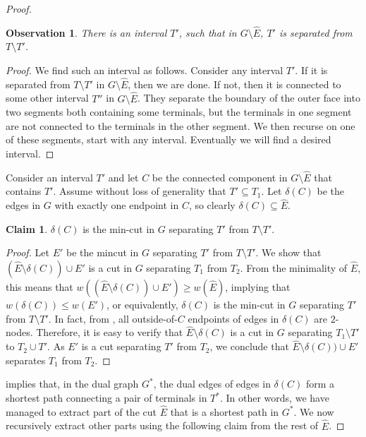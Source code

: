 \documentclass[11pt]{article}
\newtheorem{observation}[theorem]{Observation}
\theoremstyle{definition}
\newtheorem{claim}[theorem]{Claim}
\begin{document}
\begin{proof}
	\begin{observation}
		\label{obs: interval}
		There is an interval $T'$, such that in $G\setminus \hat E$, $T'$ is separated from $T\setminus T'$.
	\end{observation}
	\begin{proof}
		We find such an interval as follows. Consider any interval $T'$. If it is separated from $T\setminus T'$ in $G\setminus \hat E$, then we are done. If not, then it is connected to some other interval $T''$ in $G\setminus \hat E$. They separate the boundary of the outer face into two segments both containing some terminals, but the terminals in one segment are not connected to the terminals in the other segment. We then recurse on one of these segments, start with any interval. Eventually we will find a desired interval.
	\end{proof}
	
	Consider an interval $T'$ and let $C$ be the connected component in $G\setminus \hat E$ that contains $T'$. Assume without loss of generality that $T'\subseteq T_1$. Let $\delta(C)$ be the edges in $G$ with exactly one endpoint in $C$, so clearly $\delta(C)\subseteq \hat E$. 
	
	\begin{claim}
		\label{clm: interval cut}
		$\delta(C)$ is the min-cut in $G$ separating $T'$ from $T\setminus T'$.
	\end{claim}
	\begin{proof}
		Let $E'$ be the mincut in $G$ separating $T'$ from $T\setminus T'$. We show that $(\hat E\setminus \delta(C))\cup E'$ is a cut in $G$ separating $T_1$ from $T_2$. From the minimality of $\hat E$, this means that $w((\hat E\setminus \delta(C))\cup E')\ge w(\hat E)$, implying that $w(\delta(C))\le w(E')$, or equivalently, $\delta(C)$ is the min-cut in $G$ separating $T'$ from $T\setminus T'$.
In fact, from , all outside-of-$C$ endpoints of edges in $\delta(C)$ are $2$-nodes.
		Therefore, it is easy to verify that $\hat E\setminus \delta(C)$ is a cut in $G$ separating $T_1\setminus T'$ to $T_2\cup T'$. As $E'$ is a cut separating $T'$ from $T_2$, we conclude that $\hat E\setminus \delta(C))\cup E'$ separates $T_1$ from $T_2$.
	\end{proof}
	
	
	 implies that, in the dual graph $G^*$, the dual edges of edges in $\delta(C)$ form a shortest path connecting a pair of terminals in $T^*$.
	In other words, we have managed to extract part of the cut $\hat E$ that is a shortest path in $G^*$. We now recursively extract other parts using the following claim from the rest of $\hat E$.
	

\end{proof}
\end{document}
